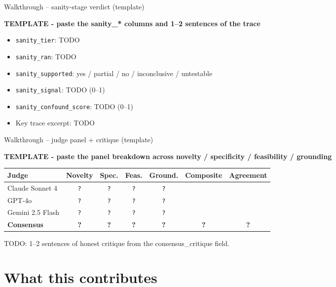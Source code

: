 \documentclass[10pt,aspectratio=169]{beamer}
\newcommand{\todoslide}[1]{%
  \begin{center}\large\color{warn}\bfseries TEMPLATE - #1\end{center}%
  \vspace{0.5em}%
}
\begin{document}
\begin{frame}{Walkthrough -- sanity-stage verdict (template)}
  \todoslide{paste the sanity\_* columns and 1--2 sentences of the trace}
  \begin{itemize}
    \item \texttt{sanity\_tier}: \alert{TODO}
    \item \texttt{sanity\_ran}: \alert{TODO}
    \item \texttt{sanity\_supported}: \alert{yes / partial / no / inconclusive / untestable}
    \item \texttt{sanity\_signal}: \alert{TODO} (0--1)
    \item \texttt{sanity\_confound\_score}: \alert{TODO} (0--1)
    \item Key trace excerpt: \alert{TODO}
  \end{itemize}
\end{frame}

\begin{frame}{Walkthrough -- judge panel + critique (template)}
  \todoslide{paste the panel breakdown across novelty / specificity / feasibility / grounding}

  \scriptsize
  \begin{tabular}{@{}l c c c c c c@{}}
    \toprule
    Judge & Novelty & Spec. & Feas. & Ground. & Composite & Agreement \\
    \midrule
    Claude Sonnet 4 & \texttt{?} & \texttt{?} & \texttt{?} & \texttt{?} & & \\
    GPT-4o          & \texttt{?} & \texttt{?} & \texttt{?} & \texttt{?} & & \\
    Gemini 2.5 Flash& \texttt{?} & \texttt{?} & \texttt{?} & \texttt{?} & & \\
    \midrule
    \textbf{Consensus} & \textbf{?} & \textbf{?} & \textbf{?} & \textbf{?} & \textbf{?} & \textbf{?} \\
    \bottomrule
  \end{tabular}

  \vspace{0.7em}
  \normalsize
  \alert{TODO}: 1--2 sentences of honest critique from the consensus\_critique field.
\end{frame}


\section{What this contributes}
\end{document}
